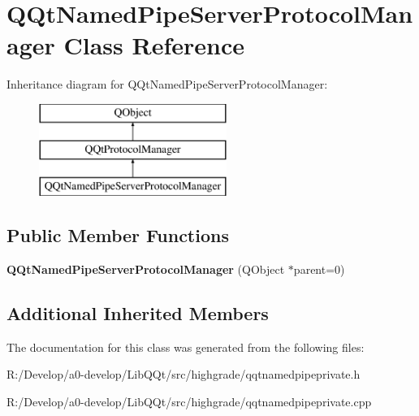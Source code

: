 \hypertarget{class_q_qt_named_pipe_server_protocol_manager}{}\section{Q\+Qt\+Named\+Pipe\+Server\+Protocol\+Manager Class Reference}
\label{class_q_qt_named_pipe_server_protocol_manager}
Inheritance diagram for Q\+Qt\+Named\+Pipe\+Server\+Protocol\+Manager\+:\begin{figure}[H]
\begin{center}
\leavevmode
\includegraphics[height=3.000000cm]{class_q_qt_named_pipe_server_protocol_manager}
\end{center}
\end{figure}
\subsection*{Public Member Functions}
\begin{DoxyCompactItemize}
\item 
\mbox{\label{class_q_qt_named_pipe_server_protocol_manager_a7361017ee28b6f19e029313013cb7162}} 
{\bfseries Q\+Qt\+Named\+Pipe\+Server\+Protocol\+Manager} (Q\+Object $\ast$parent=0)
\end{DoxyCompactItemize}
\subsection*{Additional Inherited Members}


The documentation for this class was generated from the following files\+:\begin{DoxyCompactItemize}
\item 
R\+:/\+Develop/a0-\/develop/\+Lib\+Q\+Qt/src/highgrade/qqtnamedpipeprivate.\+h\item 
R\+:/\+Develop/a0-\/develop/\+Lib\+Q\+Qt/src/highgrade/qqtnamedpipeprivate.\+cpp\end{DoxyCompactItemize}
